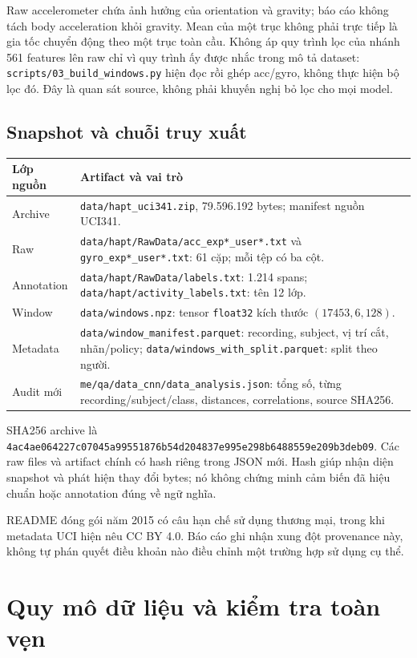 \documentclass[11pt,a4paper]{article}
\newcommand{\code}[1]{{\small\ttfamily\nolinkurl{#1}}}
\theoremstyle{definition}
\begin{document}
Raw accelerometer chứa ảnh hưởng của orientation và gravity; báo cáo không
tách body acceleration khỏi gravity. Mean của một trục không phải trực tiếp
là gia tốc chuyển động theo một trục toàn cầu. Không áp quy trình lọc của
nhánh 561 features lên raw chỉ vì quy trình ấy được nhắc trong mô tả dataset:
\code{scripts/03_build_windows.py} hiện đọc rồi ghép acc/gyro, không thực hiện
bộ lọc đó. Đây là quan sát source, không phải khuyến nghị bỏ lọc cho mọi model.

\subsection{Snapshot và chuỗi truy xuất}
\begin{tabularx}{\linewidth}{@{}P{3.0cm}Y@{}}\toprule
Lớp nguồn & Artifact và vai trò\\\midrule
Archive & \code{data/hapt_uci341.zip}, 79.596.192 bytes; manifest nguồn UCI341.\\
Raw & \code{data/hapt/RawData/acc_exp*_user*.txt} và \code{gyro_exp*_user*.txt}: 61 cặp; mỗi tệp có ba cột.\\
Annotation & \code{data/hapt/RawData/labels.txt}: 1.214 spans; \code{data/hapt/activity_labels.txt}: tên 12 lớp.\\
Window & \code{data/windows.npz}: tensor \code{float32} kích thước $(17453,6,128)$.\\
Metadata & \code{data/window_manifest.parquet}: recording, subject, vị trí cắt, nhãn/policy; \code{data/windows_with_split.parquet}: split theo người.\\
Audit mới & \code{me/qa/data_cnn/data_analysis.json}: tổng số, từng recording/subject/class, distances, correlations, source SHA256.\\\bottomrule
\end{tabularx}

SHA256 archive là
\code{4ac4ae064227c07045a99551876b54d204837e995e298b6488559e209b3deb09}.
Các raw files và artifact chính có hash riêng trong JSON mới. Hash giúp
nhận diện snapshot và phát hiện thay đổi bytes; nó không chứng minh cảm
biến đã hiệu chuẩn hoặc annotation đúng về ngữ nghĩa.

README đóng gói năm 2015 có câu hạn chế sử dụng thương mại, trong khi metadata
UCI hiện nêu CC BY 4.0. Báo cáo ghi nhận xung đột provenance này, không tự
phán quyết điều khoản nào điều chỉnh một trường hợp sử dụng cụ thể.

\section{Quy mô dữ liệu và kiểm tra toàn vẹn}
\end{document}
